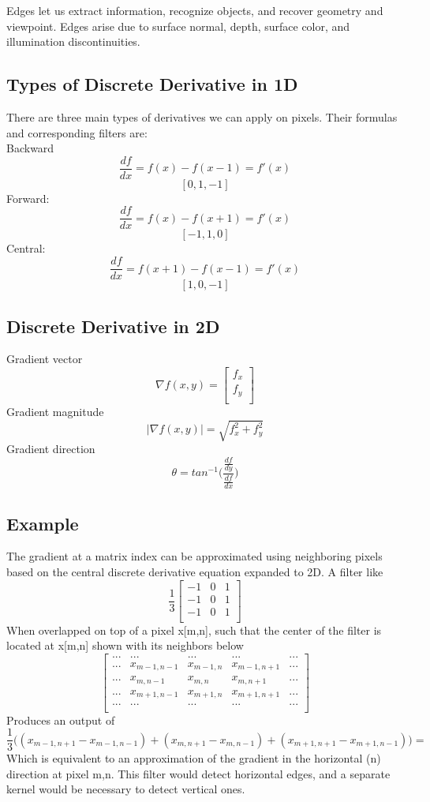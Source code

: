 \documentclass{article}
\begin{document}
Edges let us extract information, recognize objects, and recover geometry and viewpoint. Edges arise due to surface normal, depth, surface color, and illumination discontinuities. \newline

\subsection{Types of Discrete Derivative in 1D}
There are three main types of derivatives we can apply on pixels. Their formulas and corresponding filters are:\\
Backward
$$\frac{df}{dx} = f(x) - f(x-1) = f'(x)$$
$$[0, 1, -1]$$
Forward:
$$\frac{df}{dx} = f(x) - f(x+1) = f'(x)$$
$$[-1, 1, 0]$$
Central:
$$\frac{df}{dx} = f(x+1) - f(x-1) = f'(x)$$
$$[1, 0, -1]$$
\subsection{Discrete Derivative in 2D}
Gradient vector
$$ \nabla f(x,y) = \begin{bmatrix} f_x\\ 
f_y\\
\end{bmatrix}  $$
Gradient magnitude
$$ |\nabla f(x,y)| = \sqrt{f_x^2 + f_y^2}$$
Gradient direction
$$ \theta = tan^{-1}\Big( \frac{\frac{df}{dy}}{\frac{df}{dx}}\Big)$$

\subsection{Example}
The gradient at a matrix index can be approximated using neighboring pixels based on the central discrete derivative equation expanded to 2D. A filter like
$$ \frac{1}{3}\begin{bmatrix} -1 & 0 & 1\\
-1 & 0 & 1 \\
-1 & 0 & 1 \\\end{bmatrix}$$
When overlapped on top of a pixel x[m,n], such that the center of the filter is located at x[m,n] shown with its neighbors below 
$$ \begin{bmatrix}
...&...&...&...&...\\
...&x_{m-1,n-1} & x_{m-1,n} & x_{m-1,n+1}&... \\
...&x_{m,n-1} & x_{m,n} & x_{m,n+1}&...\\
...&x_{m+1,n-1} & x_{m+1,n} & x_{m+1,n+1}&...\\
...&...&...&...&...\\
\end{bmatrix}
$$
Produces an output of 
$$\frac{1}{3}\Big((x_{m-1,n+1} - x_{m-1,n-1})+ (x_{m,n+1}-x_{m,n-1}) + (x_{m+1,n+1} - x_{m+1,n-1})\Big) = $$
Which is equivalent to an approximation of the gradient in the horizontal (n) direction at pixel m,n. This filter would detect horizontal edges, and a separate kernel would be necessary to detect vertical ones.   
\end{document}
